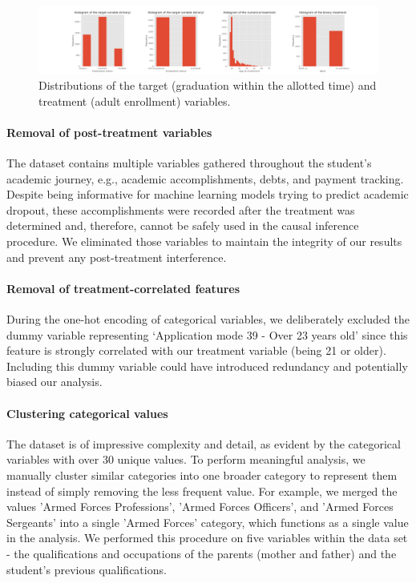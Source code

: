 \documentclass{article}
\begin{document}
\begin{figure}
    \centering
    \caption{\small{Distributions of the target (graduation within the allotted time) and treatment (adult enrollment) variables.}}
    \label{fig:target_and_treatments_histograms}
    \includegraphics[width = \textwidth]{plots/target_and_treatments_histograms.png}
\end{figure}

\paragraph{Removal of post-treatment variables} The dataset contains multiple variables gathered throughout the student's academic journey, e.g., academic accomplishments, debts, and payment tracking. Despite being informative for machine learning models trying to predict academic dropout, these accomplishments were recorded after the treatment was determined and, therefore, cannot be safely used in the causal inference procedure. We eliminated those variables to maintain the integrity of our results and prevent any post-treatment interference.

\paragraph{Removal of treatment-correlated features} During the one-hot encoding of categorical variables, we deliberately excluded the dummy variable representing `Application mode 39 - Over 23 years old' since this feature is strongly correlated with our treatment variable (being 21 or older). Including this dummy variable could have introduced redundancy and potentially biased our analysis.

\paragraph{Clustering categorical values} The dataset is of impressive complexity and detail, as evident by the categorical variables with over 30 unique values. To perform meaningful analysis, we manually cluster similar categories into one broader category to represent them instead of simply removing the less frequent value. For example, we merged the values 'Armed Forces Professions', 'Armed Forces Officers', and 'Armed Forces Sergeants' into a single 'Armed Forces' category, which functions as a single value in the analysis. We performed this procedure on five variables within the data set - the qualifications and occupations of the parents (mother and father) and the student's previous qualifications. 
\end{document}

